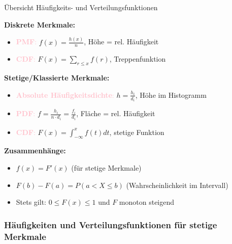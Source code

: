 \begin{KR}{Übersicht Häufigkeits- und Verteilungsfunktionen}

\textbf{Diskrete Merkmale:}
\begin{itemize}
    \setlength{\itemsep}{1pt}
    \item \textcolor{pink}{\textbf{PMF}:}
    $f(x) = \frac{h(x)}{n}$, Höhe = rel. Häufigkeit
    
    \item \textcolor{pink}{\textbf{CDF}:}
    $F(x) = \sum_{r\leq x} f(r)$, Treppenfunktion
\end{itemize}

\textbf{Stetige/Klassierte Merkmale:}
\begin{itemize}
    \setlength{\itemsep}{1pt}
    \item \textcolor{pink}{\textbf{Absolute Häufigkeitsdichte}:}
    $h = \frac{h_i}{d_i}$, Höhe im Histogramm
    
    \item \textcolor{pink}{\textbf{PDF}:}
    $f = \frac{h_i}{n \cdot d_i} = \frac{f_i}{d_i}$, Fläche = rel. Häufigkeit
    
    \item \textcolor{pink}{\textbf{CDF}:}
    $F(x) = \int_{-\infty}^x f(t)dt$, stetige Funktion
\end{itemize}

\textbf{Zusammenhänge:}
\begin{itemize}
    \setlength{\itemsep}{1pt}
    \item $f(x) = F'(x)$ \quad (für stetige Merkmale)
    \item $F(b) - F(a) = P(a < X \leq b)$ \quad (Wahrscheinlichkeit im Intervall)
    \item Stets gilt: $0 \leq F(x) \leq 1$ und $F$ monoton steigend
\end{itemize}
\end{KR}



\subsubsection{Häufigkeiten und Verteilungsfunktionen für stetige Merkmale}



